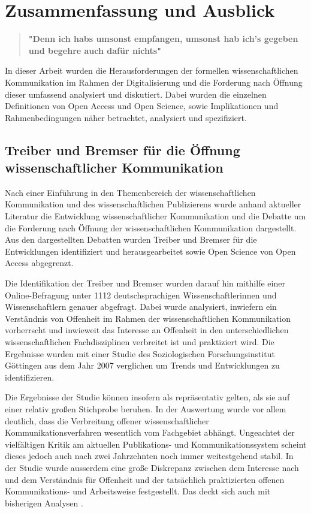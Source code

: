 \chapter{Zusammenfassung und Ausblick}

\begin{quote}
\textbf{"Denn ich habs umsonst empfangen, umsonst hab ich's gegeben und begehre auch dafür nichts"}
\end{quote} \cite{luther_1876}

In dieser Arbeit wurden die Herausforderungen der formellen wissenschaftlichen Kommunikation im Rahmen der Digitalisierung und die Forderung nach Öffnung dieser umfassend analysiert und diskutiert. Dabei wurden die einzelnen Definitionen von Open Access und Open Science, sowie Implikationen und Rahmenbedingungen näher betrachtet, analysiert und spezifiziert.

\section{Treiber und Bremser für die Öffnung wissenschaftlicher Kommunikation}

Nach einer Einführung in den Themenbereich der wissenschaftlichen Kommunikation und des wissenschaftlichen Publizierens wurde anhand aktueller Literatur die Entwicklung wissenschaftlicher Kommunikation und die Debatte um die Forderung nach Öffnung der wissenschaftlichen Kommunikation dargestellt. Aus den dargestellten Debatten wurden Treiber und Bremser für die Entwicklungen identifiziert und herausgearbeitet sowie Open Science von Open Access abgegrenzt.

Die Identifikation der Treiber und Bremser wurden darauf hin mithilfe einer Online-Befragung unter 1112 deutschsprachigen Wissenschaftlerinnen und Wissenschaftlern genauer abgefragt. Dabei wurde analysiert, inwiefern ein Verständnis von Offenheit im Rahmen der wissenschaftlichen Kommunikation vorherrscht und inwieweit das Interesse an Offenheit in den unterschiedlichen wissenschaftlichen Fachdisziplinen verbreitet ist und praktiziert wird. Die Ergebnisse wurden mit einer Studie des Soziologischen Forschungsinstitut Göttingen aus dem Jahr 2007 verglichen um Trends und Entwicklungen zu identifizieren.

Die Ergebnisse der Studie können insofern als repräsentativ gelten, als sie auf einer relativ großen Stichprobe beruhen. In der Auswertung wurde vor allem deutlich, dass die Verbreitung offener wissenschaftlicher Kommunikationsverfahren wesentlich vom Fachgebiet abhängt. Ungeachtet der vielfältigen Kritik am aktuellen Publikations- und Kommunikationssystem scheint dieses jedoch auch nach zwei Jahrzehnten noch immer weitestgehend stabil. In der Studie wurde ausserdem eine große Diskrepanz zwischen dem Interesse nach und dem Verständnis für Offenheit und der tatsächlich praktizierten offenen Kommunikations- und Arbeitsweise festgestellt. Das deckt sich auch mit bisherigen Analysen \cite{yiotis_2013_open} \cite{Bartling_2013} \cite{hagner_2015_sache_buches} \cite{Fecher_2015}.


